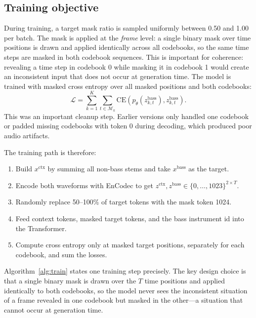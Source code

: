 \documentclass{article}
\begin{document}
\subsection{Training objective}

During training, a target mask ratio is sampled uniformly between 0.50 and 1.00 per batch. The mask is applied at the \emph{frame} level: a single binary mask over time positions is drawn and applied identically across all codebooks, so the same time steps are masked in both codebook sequences. This is important for coherence: revealing a time step in codebook 0 while masking it in codebook 1 would create an inconsistent input that does not occur at generation time. The model is trained with masked cross entropy over all masked positions and both codebooks:
\begin{equation}
    \mathcal{L}
    =
    \sum_{k=1}^{K}
    \sum_{t \in \mathcal{M}_k}
    \mathrm{CE}
    \left(
    p_\theta(z^{\mathrm{bass}}_{k,t}),
    z^{\mathrm{bass}}_{k,t}
    \right).
\end{equation}
This was an important cleanup step. Earlier versions only handled one codebook or padded missing codebooks with token 0 during decoding, which produced poor audio artifacts.

The training path is therefore:
\begin{enumerate}
    \item Build $x^{\mathrm{ctx}}$ by summing all non-bass stems and take $x^{\mathrm{bass}}$ as the target.
    \item Encode both waveforms with EnCodec to get $z^{\mathrm{ctx}}, z^{\mathrm{bass}} \in \{0,\ldots,1023\}^{2 \times T}$.
    \item Randomly replace 50--100\% of target tokens with the mask token 1024.
    \item Feed context tokens, masked target tokens, and the bass instrument id into the Transformer.
    \item Compute cross entropy only at masked target positions, separately for each codebook, and sum the losses.
\end{enumerate}

Algorithm~\ref{alg:train} states one training step precisely. The key design choice is that a single binary mask is drawn over the $T$ time positions and applied identically to both codebooks, so the model never sees the inconsistent situation of a frame revealed in one codebook but masked in the other---a situation that cannot occur at generation time.
\end{document}
